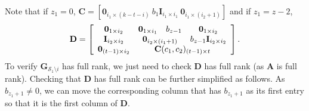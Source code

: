 \documentclass[journal,twocolumn]{IEEEtran}
\theoremstyle{definition}
\newcommand{\calS}{\mathcal{S}}
\newcommand{\bfG}{\mathbf{G}}
\newcommand{\bfI}{\mathbf{I}}
\newcommand{\bfC}{\mathbf{C}}
\newcommand{\bfD}{\mathbf{D}}
\newcommand{\bfzr}{\mathbf{0}}
\newcommand{\aditya}[1]{\marginpar{+}{\bf Aditya's remark}: {\em #1}}
\newcommand{\litang}[1]{\marginpar{+}{\bf Li's remark}: {\em #1}}
\begin{document}
\begin{itemize}
	Note that if $z_1=0$, $\bfC=[\bfzr_{i_1\times(k-t-i)}~b_1\bfI_{i_1\times i_1}~\bfzr_{i_1\times (i_2+1)}]$ and if $z_1=z-2$, %
	$$
	\mathbf D =
	\left[
	\begin{array}{cccc}
	\bfzr_{1\times i_2} & \bfzr_{1\times i_1} & b_{z-1} & \bfzr_{1\times i_2}\\
     \bfI_{i_2\times i_2} &\multicolumn{2}{c}{\bfzr_{i_2\times (i_1+1)}} & {b_{z-1}}\bfI_{i_2\times i_2}\\
	\bfzr_{(t-1)\times i_2}&\multicolumn{3}{c}{\bfC(c_1, c_2)_{(t-1)\times t}}
	\end{array}
	\right].
	$$
To verify $\bfG_{\calS_1 \setminus i}$ has full rank, we just need to check $\bfD$ has full rank (as $\mathbf A$ is full rank). Checking that $\bfD$ has full rank can be further simplified as follows. As $b_{z_1 + 1} \neq 0$, we can move the corresponding column that has $b_{z_1 + 1}$ as its first entry so that it is the first column of $\bfD$.


\end{itemize}
\end{document}
